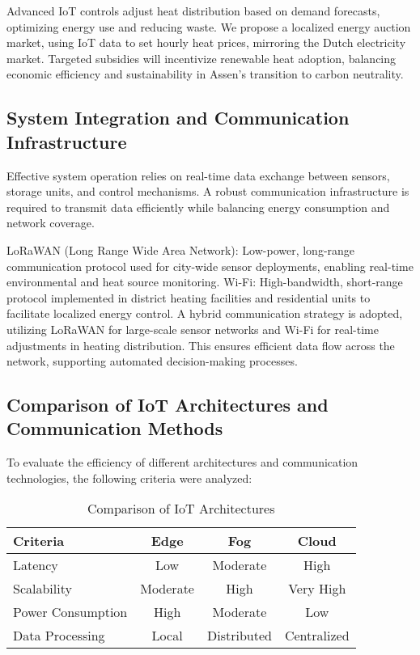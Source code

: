 \documentclass[conference]{IEEEtran}
\begin{document}
Advanced IoT controls adjust heat distribution based on demand forecasts, optimizing energy use and reducing waste. We propose a localized energy auction market, using IoT data to set hourly heat prices, mirroring the Dutch electricity market. Targeted subsidies will incentivize renewable heat adoption, balancing economic efficiency and sustainability in Assen's transition to carbon neutrality.

\subsection{System Integration and Communication Infrastructure}

Effective system operation relies on real-time data exchange between sensors, storage units, and control mechanisms. A robust communication infrastructure is required to transmit data efficiently while balancing energy consumption and network coverage.

LoRaWAN (Long Range Wide Area Network): Low-power, long-range communication protocol used for city-wide sensor deployments, enabling real-time environmental and heat source monitoring.
Wi-Fi: High-bandwidth, short-range protocol implemented in district heating facilities and residential units to facilitate localized energy control.
A hybrid communication strategy is adopted, utilizing LoRaWAN for large-scale sensor networks and Wi-Fi for real-time adjustments in heating distribution. This ensures efficient data flow across the network, supporting automated decision-making processes.

\subsection{Comparison of IoT Architectures and Communication Methods}

To evaluate the efficiency of different architectures and communication technologies, the following criteria were analyzed:

\begin{table}[h]
\centering
\caption{Comparison of IoT Architectures}
\begin{tabular}{|l|c|c|c|}
\hline
\textbf{Criteria} & \textbf{Edge} & \textbf{Fog} & \textbf{Cloud} \\
\hline
Latency & Low & Moderate & High \\
Scalability & Moderate & High & Very High \\
Power Consumption & High & Moderate & Low \\
Data Processing & Local & Distributed & Centralized \\
\hline
\end{tabular}
\end{table}
\end{document}
